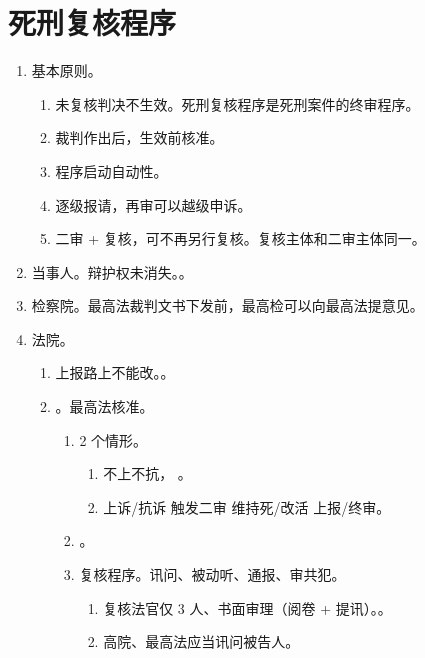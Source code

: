 \section{死刑复核程序}
\begin{enumerate}
  \item 基本原则。
        \begin{enumerate}
          \item 未复核判决不生效。死刑复核程序是死刑案件的终审程序。
          \item 裁判作出后，生效前核准。
          \item 程序启动自动性。
          \item 逐级报请，再审可以越级申诉。
          \item 二审 + 复核，可不再另行复核。复核主体和二审主体同一。
        \end{enumerate}
  \item 当事人。辩护权未消失。。
  \item 检察院。最高法裁判文书下发前，最高检可以向最高法提意见。
  \item 法院。
        \begin{enumerate}
          \item 上报路上不能改。。
          \item {}。最高法核准。
                \begin{enumerate}
                  \item 2 个情形。
                        \begin{enumerate}
                          \item 不上不抗， \yjt {} \yjt {}。
                          \item 上诉/抗诉 \yjt 触发二审 \yjt 维持死/改活 \yjt 上报/终审。
                        \end{enumerate}
                        
                  \item {} \yjt {}。
                  \item 复核程序。讯问、被动听、通报、审共犯。
                        \begin{enumerate}
                          \item 复核法官仅 3 人、书面审理（阅卷 + 提讯）。。
                          \item 高院、最高法应当讯问被告人。

\end{enumerate}
\end{enumerate}
\end{enumerate}
\end{enumerate}

